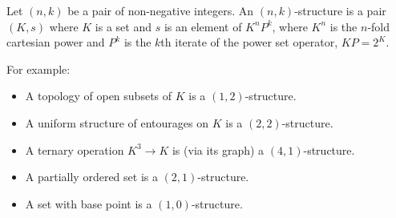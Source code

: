 Let $(n, k)$ be a pair of non-negative integers. An $(n, k)$-structure is a pair $(K, s)$ where $K$ is a set and $s$ is an element of $K^n P^k$, where $K^n$ is the $n$-fold cartesian power and $P^k$ is the $k$th iterate of the power set operator, $KP = 2^K$.

For example:
\begin{itemize}
\item A topology of open subsets of $K$ is a $(1, 2)$-structure.
\item A uniform structure of entourages on $K$ is a $(2, 2)$-structure.
\item A ternary operation $K^3 \longrightarrow K$ is (via its graph) a $(4, 1)$-structure.
\item A partially ordered set is a $(2, 1)$-structure.
\item A set with base point is a $(1, 0)$-structure.
\end{itemize}
